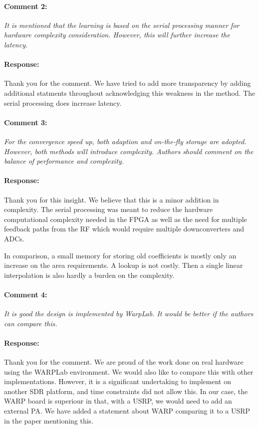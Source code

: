 \documentclass[]{article}
\begin{document}
\paragraph{Comment 2:}\textit{It is mentioned that the learning is based on the serial processing manner for hardware complexity consideration. However, this will further increase the latency.}
\paragraph{Response:}
Thank you for the comment. We have tried to add more transparency by adding additional statments throughout acknowledging this weakness in the method. The serial processing does increase latency.
	
\paragraph{Comment 3:}\textit{For the convergence speed up, both adaption and on-the-fly storage are adopted. However, both methods will introduce complexity. Authors should comment on the balance of performance and complexity.}
\paragraph{Response:}
Thank you for this insight. We believe that this is a minor addition in complexity. The serial processing was meant to reduce the hardware computational complexity needed in the FPGA as well as the need for multiple feedback paths from the RF which would require multiple downconverters and ADCs.

In comparison, a small memory for storing old coefficients is mostly only an increase on the area requirements. A lookup is not costly. Then a single linear interpolation is also hardly a burden on the complexity.
	
\paragraph{Comment 4:}\textit{It is good the design is implemented by WarpLab. It would be better if the authors can compare this.}
\paragraph{Response:}
Thank you for the comment. We are proud of the work done on real hardware using the WARPLab environment. We would also like to compare this with other implementations. However, it is a significant undertaking to implement on another SDR platform, and time constraints did not allow this. In our case, the WARP board is superiour in that, with a USRP, we would need to add an external PA. We have added a statement about WARP comparing it to a USRP in the paper mentioning this. 
\end{document}
